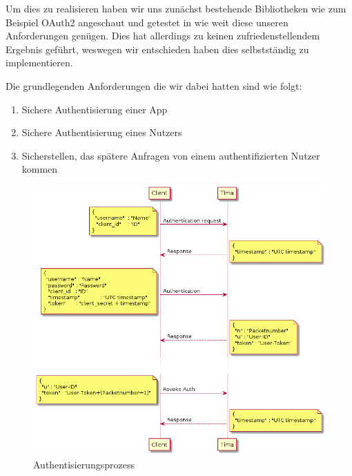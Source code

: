 Um dies zu realisieren haben wir uns zunächst bestehende Bibliotheken wie zum Beispiel OAuth2 angeschaut und getestet in wie weit diese unseren Anforderungen genügen. Dies hat allerdings zu keinen zufriedenstellendem Ergebnis geführt, weswegen wir entschieden haben dies selbstständig zu implementieren.

Die grundlegenden Anforderungen die wir dabei hatten sind wie folgt:
\begin{enumerate}
	\item Sichere Authentisierung einer App
	\item Sichere Authentisierung eines Nutzers
	\item Sicherstellen, das spätere Anfragen von einem authentifizierten Nutzer kommen
\end{enumerate}

\begin{figure}[!h]
	\centering
	\includegraphics[width=\textwidth]{images/auth.png}
	\caption{Authentisierungsprozess}
	\label{fig:auth}
\end{figure}

